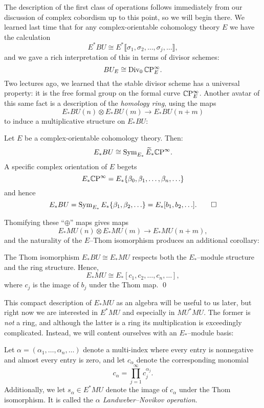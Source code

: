 The description of the first class of operations follows immediately from our discussion of complex cobordism up to this point, so we will begin there.  We learned last time that for any complex-orientable cohomology theory $E$ we have the calculation \[E^* BU \cong E^*\llbracket \sigma_1, \sigma_2, \ldots, \sigma_j, \ldots\rrbracket,\] and we gave a rich interpretation of this in terms of divisor schemes: \[BU_E \cong \operatorname{Div}_0 \mathbb{C}\mathrm P^\infty_E.\]  Two lectures ago, we learned that the stable divisor scheme has a universal property: it is the free formal group on the formal curve $\mathbb{C}\mathrm P^\infty_E$.  Another avatar of this same fact is a description of the \emph{homology ring}, using the maps \[E_* BU(n) \otimes E_* BU(m) \to E_* BU(n+m)\] to induce a multiplicative structure on $E_* BU$:
\begin{corollary}
Let $E$ be a complex-orientable cohomology theory. Then: \[E_* BU \cong \operatorname{Sym}_{E_*} \widetilde E_* \mathbb{C}\mathrm P^\infty.\]  A specific complex orientation of $E$ begets \[E_* \mathbb{C}\mathrm P^\infty = E_*\{\beta_0, \beta_1, \ldots, \beta_n, \ldots\}\] and hence \[E_* BU = \operatorname{Sym}_{E_*} E_*\{\beta_1, \beta_2, \ldots\} = E_*[b_1, b_2, \ldots]. \qed\]
\end{corollary} 

Thomifying these ``$\oplus$'' maps gives maps \[E_* MU(n) \otimes E_* MU(m) \to E_* MU(n+m),\] and the naturality of the $E$--Thom isomorphism produces an additional corollary:
\begin{corollary}
The Thom isomorphism $E_* BU \cong E_* MU$ respects both the $E_*$--module structure and the ring structure.  Hence, \[E_* MU \cong E_*[c_1, c_2, \ldots, c_n, \ldots],\] where $c_j$ is the image of $b_j$ under the Thom map. \qed
\end{corollary}


\noindent This compact description of $E_* MU$ as an algebra will be useful to us later, but right now we are interested in $E^* MU$ and especially in $MU^* MU$.  The former is \emph{not} a ring, and although the latter is a ring its multiplication is exceedingly complicated.  Instead, we will content ourselves with an $E_*$--module basis:
\begin{definition}
Let $\alpha = (\alpha_1, \ldots, \alpha_n, \ldots)$ denote a multi-index where every entry is nonnegative and almost every entry is zero, and let $c_\alpha$ denote the corresponding monomial \[c_\alpha = \prod_{j=1}^\infty c_j^{\alpha_j}.\]  Additionally, we let $s_\alpha \in E^* MU$ denote the image of $c_\alpha$ under the Thom isomorphism.  It is called the \textit{$\alpha${\th} Landweber--Novikov operation}.
\end{definition}

